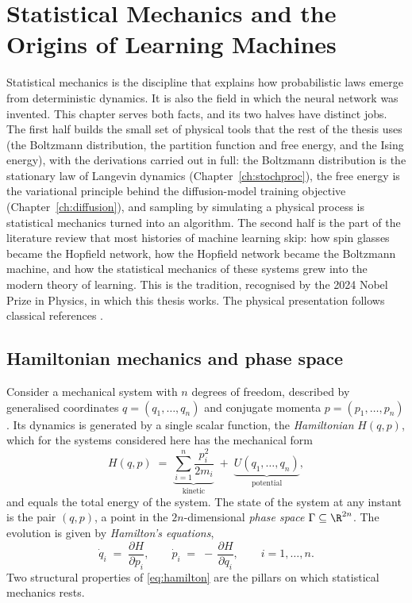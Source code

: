 \chapter{Statistical Mechanics and the Origins of Learning Machines}
\label{ch:statmech}\label{ch:background}

Statistical mechanics is the discipline that explains how probabilistic
laws emerge from deterministic dynamics. It is also the field in which the
neural network was invented. This chapter serves both facts, and its two
halves have distinct jobs. The first half builds the small set of physical
tools that the rest of the thesis uses (the Boltzmann distribution, the
partition function and free energy, and the Ising energy), with the
derivations carried out in full: the Boltzmann distribution is the
stationary law of Langevin dynamics (Chapter~\ref{ch:stochproc}), the free
energy is the variational principle behind the diffusion-model training
objective (Chapter~\ref{ch:diffusion}), and sampling by simulating a
physical process is statistical mechanics turned into an algorithm. The
second half is the part of the literature review that most histories of
machine learning skip: how spin glasses became the Hopfield network, how
the Hopfield network became the Boltzmann machine, and how the statistical
mechanics of these systems grew into the modern theory of learning. This
is the tradition, recognised by the 2024 Nobel Prize in Physics, in which
this thesis works. The physical presentation follows classical references
\citep{goldstein2002classical, landau1980statistical}.

\section{Hamiltonian mechanics and phase space}\label{sec:hamiltonian}

Consider a mechanical system with $n$ degrees of freedom, described by
generalised coordinates $q = (q_1, \dots, q_n)$ and conjugate momenta
$p = (p_1, \dots, p_n)$. Its dynamics is generated by a single scalar
function, the \emph{Hamiltonian} $H(q, p)$, which for the systems
considered here has the mechanical form
\begin{equation}
  H(q, p) \;=\; \underbrace{\sum_{i=1}^{n} \frac{p_i^2}{2m_i}}_{\text{kinetic}}
  \;+\; \underbrace{U(q_1, \dots, q_n)}_{\text{potential}},
  \label{eq:hamiltonian}
\end{equation}
and equals the total energy of the system. The state of the system at any
instant is the pair $(q, p)$, a point in the $2n$-dimensional \emph{phase
space} $\Gamma \subseteq \R^{2n}$. The evolution is given by
\emph{Hamilton's equations},
\begin{equation}
  \dot{q}_i \;=\; \frac{\partial H}{\partial p_i},
  \qquad
  \dot{p}_i \;=\; -\,\frac{\partial H}{\partial q_i},
  \qquad i = 1, \dots, n.
  \label{eq:hamilton}
\end{equation}
Two structural properties of \eqref{eq:hamilton} are the pillars on which
statistical mechanics rests.

